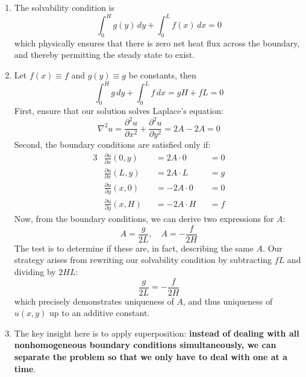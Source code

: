 \documentclass[a4paper]{article}
\begin{document}
\begin{enumerate}[label=(\alph*)]
	\item The solvability condition is
	\[
		\int^{H}_{0} g \!\left( y \right) \, dy + \int^{L}_{0} f \!\left( x \right) \, dx = 0  
	\]
	which physically ensures that there is zero net heat flux across the boundary, and thereby permitting the steady state to exist.
	\item Let \( f \!\left( x \right) \equiv f \) and \( g \!\left( y \right) \equiv g \) be constants, then
	\[
		\int^{H}_{0} g \, dy + \int^{L}_{0} f \, dx = gH + fL = 0  
	\]
	First, ensure that our solution solves Laplace's equation:
	\[
		\nabla^{2}u = \frac{\partial^2 u}{\partial x^2} + \frac{\partial^2 u}{\partial y^2} = 2A - 2A = 0 
	\]
	Second, the boundary conditions are satisfied only if:
	\begin{alignat*}{3}
		& \frac{\partial u}{\partial x}\!\left( 0,y \right) && = 2A \cdot 0 && = 0 \\
		& \frac{\partial u}{\partial x}\!\left( L,y \right) && = 2A \cdot L && = g \\ 
		& \frac{\partial u}{\partial y}\!\left( x,0 \right) && = -2A \cdot 0 && = 0 \\
		& \frac{\partial u}{\partial y}\!\left( x,H \right) && = -2A \cdot H && = f
	\end{alignat*}
	Now, from the boundary conditions, we can derive two expressions for \( A \):
	\[
		A = \frac{g}{2L}, \quad A = -\frac{f}{2H}
	\]
	The test is to determine if these are, in fact, describing the same \( A \). Our strategy arises from rewriting our solvability condition by subtracting \( fL \) and dividing by \( 2HL \):
	\[
		\frac{g}{2L} = -\frac{f}{2H}
	\]
	which precisely demonstrates uniqueness of \( A \), and thus uniqueness of \( u \!\left( x,y \right) \) up to an additive constant.
\item The key insight here is to apply superposition: \textbf{instead of dealing with all nonhomogeneous boundary conditions simultaneously, we can separate the problem so that we only have to deal with one at a time}. 


\end{enumerate}
\end{document}
